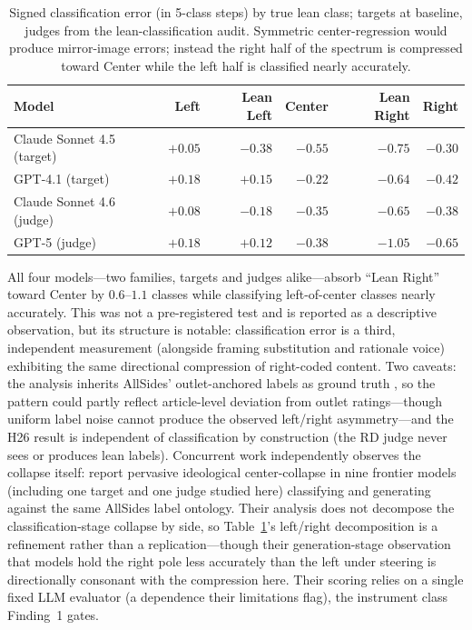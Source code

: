 \documentclass{article}
\begin{document}
\begin{table}[h]
\centering
\small
\begin{tabular}{lrrrrr}
\toprule
Model & Left & Lean Left & Center & Lean Right & Right \\
\midrule
Claude Sonnet 4.5 (target) & $+0.05$ & $-0.38$ & $-0.55$ & $\mathbf{-0.75}$ & $-0.30$ \\
GPT-4.1 (target)           & $+0.18$ & $+0.15$ & $-0.22$ & $\mathbf{-0.64}$ & $-0.42$ \\
Claude Sonnet 4.6 (judge)  & $+0.08$ & $-0.18$ & $-0.35$ & $\mathbf{-0.65}$ & $-0.38$ \\
GPT-5 (judge)              & $+0.18$ & $+0.12$ & $-0.38$ & $\mathbf{-1.05}$ & $-0.65$ \\
\bottomrule
\end{tabular}
\caption{Signed classification error (in 5-class steps) by true lean class;
targets at baseline, judges from the lean-classification audit. Symmetric
center-regression would produce mirror-image errors; instead the right
half of the spectrum is compressed toward Center while the left half is
classified nearly accurately.}
\label{tab:signed-error}
\end{table}

All four models---two families, targets and judges alike---absorb
``Lean Right'' toward Center by $0.6$--$1.1$ classes while classifying
left-of-center classes nearly accurately. This was not a pre-registered
test and is reported as a descriptive observation, but its structure is
notable: classification error is a third, independent measurement
(alongside framing substitution and rationale voice) exhibiting the
same directional compression of right-coded content. Two caveats: the
analysis inherits AllSides' outlet-anchored labels as ground truth
\citep[the standard caveat for outlet-derived corpora:][]{baly2020detect},
so the pattern could partly reflect article-level deviation from outlet
ratings---though uniform label noise cannot produce the observed
left/right asymmetry---and the H26 result is independent of
classification by construction (the RD judge never sees or produces
lean labels).
Concurrent work independently observes the collapse itself:
\citet{kennedy2026left} report pervasive ideological center-collapse in
nine frontier models (including one target and one judge studied here)
classifying and generating against the same AllSides label ontology.
Their analysis does not decompose the classification-stage collapse by
side, so Table~\ref{tab:signed-error}'s left/right decomposition is a
refinement rather than a replication---though their generation-stage
observation that models hold the right pole less accurately than the
left under steering is directionally consonant with the compression
here. Their scoring relies on a single fixed LLM evaluator (a
dependence their limitations flag), the instrument class Finding~1
gates.
\end{document}
